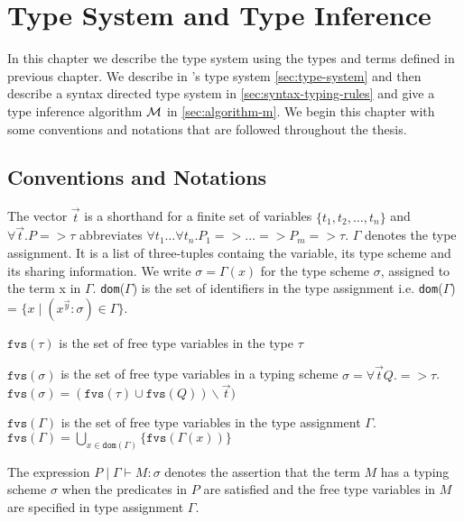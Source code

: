 \chapter{Type System and Type Inference}\label{chp:qub-type-system}
In this chapter we describe the type system using the types and terms defined in previous
chapter. We describe in \qub{}'s type system \cref{sec:type-system} and then describe a
syntax directed type system in \cref{sec:syntax-typing-rules} and give a type inference algorithm $\mathcal{M}$ in \cref{sec:algorithm-m}.
We begin this chapter with some conventions and notations that are followed throughout the thesis.

\section{Conventions and Notations}
The vector $\vec{t}$ is a shorthand for a finite set of variables $\{t_1, t_2, \dots, t_n\}$ and  $\forall \vec{t}. P => \tau$ abbreviates
$\forall t_1 \dots \forall t_n. P_1 => \dots => P_m => \tau$.
$\Gamma$ denotes the type assignment. It is a list of three-tuples containg the variable, its type scheme and its sharing information.
We write $\sigma = \Gamma(x)$ for the type scheme $\sigma$, assigned to the term x in $\Gamma$.
\texttt{dom}($\Gamma$) is the set of identifiers in the type assignment i.e.
\texttt{dom}($\Gamma$) = $\{ x \mid (x^{\vec{y}}:\sigma) \in \Gamma\}$.

\begin{defn}

  $\texttt{fvs}(\tau)$ is the set of free type variables in the type $\tau$

  \noindent$\texttt{fvs}(\sigma)$ is the set of free type variables in a typing scheme $\sigma = \forall \vec{t} Q. => \tau$.\\
  $\texttt{fvs}(\sigma) = (\texttt{fvs}(\tau) \cup \texttt{fvs}(Q)) \backslash \vec{t})$

  \noindent$\texttt{fvs}(\Gamma)$ is the set of free type variables in the type assignment $\Gamma$.\\
  $\texttt{fvs}(\Gamma) = \bigcup_{x \in \texttt{dom}(\Gamma)} \{ \texttt{fvs}(\Gamma(x)) \}$
\end{defn}

\begin{defn}
The expression $P \mid \Gamma \vdash M : \sigma$ denotes the assertion that the term $M$ has a typing scheme $\sigma$
when the predicates in $P$ are satisfied and the free type variables in $M$ are specified in type assignment $\Gamma$.
\end{defn}

